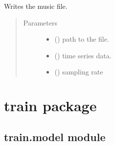 \documentclass[letterpaper,10pt,english,openany,oneside]{sphinxmanual}
\begin{document}

\begin{fulllineitems}
\label{\detokenize{docs/source/preprocess:preprocess.utility.write}}
Writes the music file.
\begin{quote}\begin{description}
\item[{Parameters}] \leavevmode\begin{itemize}
\item {} 
 () \textendash{} path to the file.

\item {} 
 (\sphinxstyleliteralemphasis{\sphinxupquote{, }}\sphinxstyleliteralemphasis{\sphinxupquote{(}}\sphinxstyleliteralemphasis{\sphinxupquote{, }}\sphinxstyleliteralemphasis{\sphinxupquote{)}}) \textendash{} time series data.

\item {} 
 () \textendash{} sampling rate

\end{itemize}

\end{description}\end{quote}

\end{fulllineitems}



\chapter{train package}
\label{\detokenize{docs/source/train:train-package}}\label{\detokenize{docs/source/train::doc}}

\section{train.model module}
\label{\detokenize{docs/source/train:module-train.model}}\label{\detokenize{docs/source/train:train-model-module}}
\end{document}
